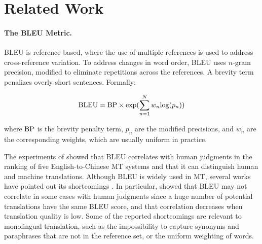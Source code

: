 \documentclass[11pt,a4paper]{article}
\begin{document}

\section{Related Work} \label{sec:related_work}

\paragraph{The BLEU Metric.}

BLEU \citep{P02} is reference-based, where the use of multiple references is used to address cross-reference variation.
To address changes in word order, BLEU uses $n$-gram precision, 
modified to eliminate repetitions across the references. A brevity term penalizes overly short sentences. Formally:

\vspace{-0.2cm}
\begin{small}
 $${\rm BLEU} = {\rm BP} \times {\rm exp}(\sum_{n=1}^{N} w_{n} {\rm log}(p_{n}))$$
\end{small}
\vspace{-0.3cm}

where ${\rm BP}$ is the brevity penalty term, $p_n$ are the modified precisions, and $w_n$ are the corresponding weights,
which are usually uniform in practice.

The experiments of \citet{P02} showed that BLEU correlates with human judgments in the ranking of five English-to-Chinese MT systems and that it can distinguish human and machine translations. Although BLEU is widely used in MT, several works have pointed out its shortcomings \citep[e.g.,][]{KM06}. In particular, \citet{C06} showed that BLEU may not correlate in some cases with human judgments since a huge number of potential translations have the same BLEU score, and that correlation decreases when translation quality is low. Some of the reported shortcomings are relevant to monolingual translation, such as the impossibility to capture synonyms and paraphrases that are not in the reference set, or the uniform weighting of words. %
\end{document}
